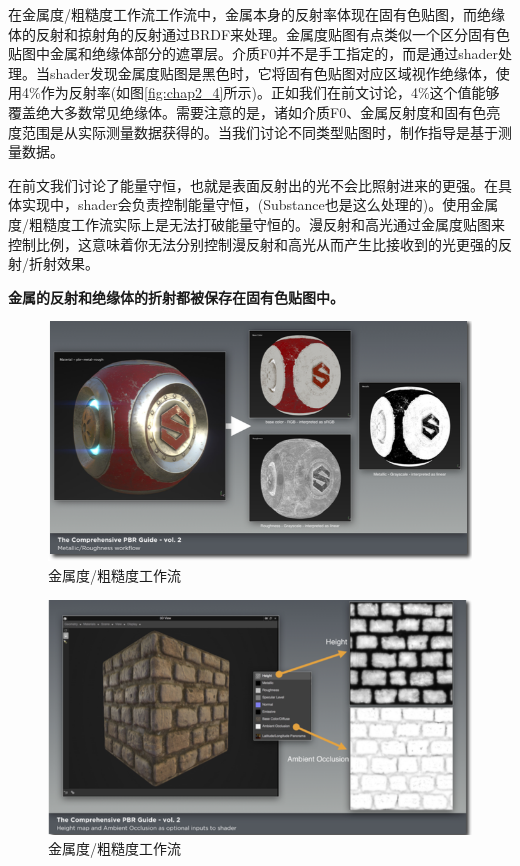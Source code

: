 在金属度/粗糙度工作流工作流中，金属本身的反射率体现在固有色贴图，而绝缘体的反射和掠射角的反射通过BRDF来处理。金属度贴图有点类似一个区分固有色贴图中金属和绝缘体部分的遮罩层。介质F0并不是手工指定的，而是通过shader处理。当shader发现金属度贴图是黑色时，它将固有色贴图对应区域视作绝缘体，使用4\%作为反射率(如图\ref{fig:chap2_4}所示)。正如我们在前文讨论，4\%这个值能够覆盖绝大多数常见绝缘体。需要注意的是，诸如介质F0、金属反射度和固有色亮度范围是从实际测量数据获得的。当我们讨论不同类型贴图时，制作指导是基于测量数据。

在前文我们讨论了能量守恒，也就是表面反射出的光不会比照射进来的更强。在具体实现中，shader会负责控制能量守恒，(Substance也是这么处理的)。使用金属度/粗糙度工作流实际上是无法打破能量守恒的。漫反射和高光通过金属度贴图来控制比例，这意味着你无法分别控制漫反射和高光从而产生比接收到的光更强的反射/折射效果。

\textbf{金属的反射和绝缘体的折射都被保存在固有色贴图中。}

\begin{figure}[ht]
    \centering
	\includegraphics[width=\textwidth]{images/chap2_2.png}
	\caption{金属度/粗糙度工作流}
    \label{fig:chap2_2}
\end{figure}

\begin{figure}[ht]
    \centering
	\includegraphics[width=\textwidth]{images/chap2_3.png}
	\caption{金属度/粗糙度工作流}
    \label{fig:chap2_3}
\end{figure}


